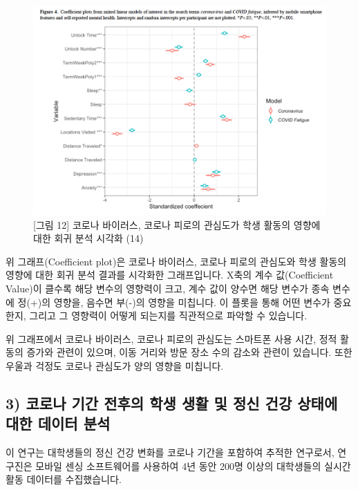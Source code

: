\documentclass[
  letterpaper,
]{book}
\begin{document}
\begin{figure}[H]

{\centering \includegraphics{img/fig12.png}

}

\caption{{[}그림 12{]} 코로나 바이러스, 코로나 피로의 관심도가 학생
활동의 영향에 대한 회귀 분석 시각화 (14)}

\end{figure}%

위 그래프(Coefficient plot)은 코로나 바이러스, 코로나 피로의 관심도와
학생 활동의 영향에 대한 회귀 분석 결과를 시각화한 그래프입니다. X축의
계수 값(Coefficient Value)이 클수록 해당 변수의 영향력이 크고, 계수 값이
양수면 해당 변수가 종속 변수에 정(+)의 영향을, 음수면 부(-)의 영향을
미칩니다. 이 플롯을 통해 어떤 변수가 중요한지, 그리고 그 영향력이 어떻게
되는지를 직관적으로 파악할 수 있습니다.

위 그래프에서 코로나 바이러스, 코로나 피로의 관심도는 스마트폰 사용
시간, 정적 활동의 증가와 관련이 있으며, 이동 거리와 방문 장소 수의
감소와 관련이 있습니다. 또한 우울과 걱정도 코로나 관심도가 양의 영향을
미칩니다.

\subsection{3) 코로나 기간 전후의 학생 생활 및 정신 건강 상태에 대한
데이터
분석}\label{uxcf54uxb85cuxb098-uxae30uxac04-uxc804uxd6c4uxc758-uxd559uxc0dd-uxc0dduxd65c-uxbc0f-uxc815uxc2e0-uxac74uxac15-uxc0c1uxd0dcuxc5d0-uxb300uxd55c-uxb370uxc774uxd130-uxbd84uxc11d}

이 연구는 대학생들의 정신 건강 변화를 코로나 기간을 포함하여 추적한
연구로서, 연구진은 모바일 센싱 소프트웨어를 사용하여 4년 동안 200명
이상의 대학생들의 실시간 활동 데이터를 수집했습니다.
\end{document}
